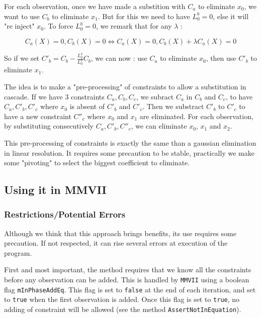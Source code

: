 For each observation, once we have made a substition with $C_a$ to eliminate $x_0$,
 we  want to use $C_b$ to eliminate $x_1$.
But for this we need to have $ L^b_0=0$, else it will "re inject" $x_0$.  To
force $L^b_0=0$, we remark  that for any $\lambda$ :

\begin{equation}
    C_a(X)=0  , C_b(X)=0   \Leftrightarrow  C_a(X)=0  , C_b(X)+\lambda C_a(X) =0
\end{equation}

So if we set $C'_b = C_b - \frac{L^b_0}{L^a_0} C_b$, we can now : use $C_a$ to eliminate $x_0$,
then use $C'_b$ to eliminate $x_1$. 

The idea is to make a "pre-processing" of constraints to allow a substitution in cascade.
If we have $3$ constraints $C_a, C_b, C_c$, we subract $C_a$ in $C_b$ and $C_c$, to have $C_a, C'_b, C'_c$
where $x_0$ is absent of $C'_b$ and $C'_c$. Then we substract  $C'_b$ to $C'_c$ to have a new constraint 
$C''_c$ where  $x_0$ and $x_1$ are eliminated.  For each observation, by substituting consecutively $C_a,C'_b,C''_c$, we can eliminate
$x_0$, $x_1$ and $x_2$.

This pre-processing of constraints is exactly the same than a gaussian elimination in linear resolution.
It requires some precaution to be stable, practically we make some "pivoting" to select the biggest coefficient
to eliminate.


\subsection{Using it in MMVII}

\label{Cstr:Use:MMVII}


\subsubsection{Restrictions/Potential Errors}

Although we think that this approach brings benefits, its use requires some precaution.
If not respected, it can rise several errors at execution of the program.

First and most important, the method requires that we know all the constraints
before any observation can be added.  This is handled by {\tt MMVII} using a boolean flag {\tt mInPhaseAddEq}.
This flag is set to {\tt false}  at the end of each iteration, and set to {\tt true} when
the first observation is added.  Once this flag is set to {\tt true}, no adding of constraint
will be allowed (see the method {\tt AssertNotInEquation}).

